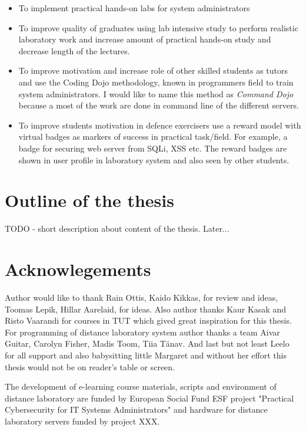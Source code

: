 \begin{itemize}
\item To implement practical hands-on labs for system administrators
\item To improve quality of graduates using lab intensive study  to perform realistic laboratory work and increase amount of practical hands-on study and decrease length of the lectures.
\item To improve motivation and increase role of other skilled students as tutors and use the \gls{Coding Dojo} methodology, known in programmers field to train system administrators. I would like to name this method as \emph{Command Dojo} because a most of the work are done in command line of the different servers.
\item To improve students motivation in defence exercisers use a reward model with virtual badges as markers of success in practical task/field. For example, a badge for securing web server from \gls{SQLi}, \gls{XSS} etc. The reward badges are shown in user profile in laboratory system and also seen by other students.
\end{itemize}
\par


\section{Outline of the thesis}
{\color{red} TODO - short description about content of the thesis. Later... }

 
\section{Acknowlegements}
Author would like to thank Rain Ottis, Kaido Kikkas, for review and ideas, Toomas Lepik, Hillar Aarelaid, for ideas. Also author thanks Kaur Kasak and Risto Vaarandi for courses in TUT which gived great inspiration for this thesis. For programming of distance laboratory system author thanks a team Aivar Guitar, Carolyn Fisher, Madis Toom, Tiia Tänav. And last but not least Leelo for all support and also babysitting little Margaret and without her effort this thesis would not be on reader's table or screen.

The development of e-learning course materials, scripts and environment of distance laboratory are funded by European Social Fund \gls{ESF} project "Practical Cybersecurity for IT Systems Administrators" \citep{website:ESF_project} and hardware for distance laboratory servers funded by project XXX.

